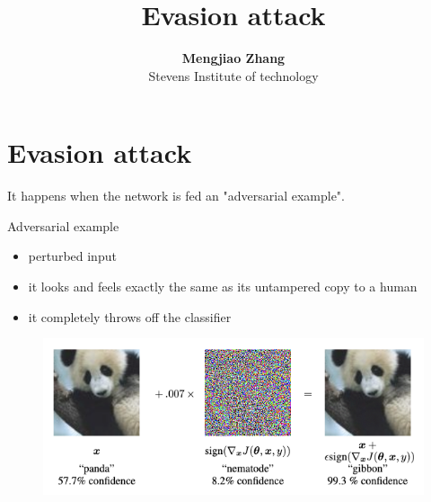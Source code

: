 \documentclass[11pt]{article}
\numberwithin{equation}{section}
\begin{document}


\title{Evasion attack}

\author{\textbf{Mengjiao Zhang} \\ Stevens Institute of technology}


\maketitle







\section{Evasion attack} \label{sec:optimization}

It happens when the network is fed an "adversarial example".

\colorbox{orange!15}{Adversarial example}

\begin{itemize}
    \item perturbed input
    \item it looks and feels exactly the same as its untampered copy to a human
    \item it completely throws off the classifier
\end{itemize}

\begin{figure}[!h]
	\centering
	\includegraphics[width=12cm]{figures/evasion.png}
	\label{fig:evasion}
\end{figure}
\end{document}
